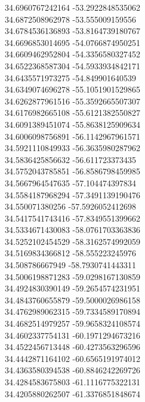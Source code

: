 {34.6960767242164	-53.2922848535062\\
34.6872508962978	-53.555009159556\\
34.6784536136893	-53.8164739180767\\
34.6696853014695	-54.0766874950251\\
34.6609462952804	-54.3356580327452\\
34.6522368587304	-54.5933934842171\\
34.6435571973275	-54.849901640539\\
34.6349074696278	-55.1051901529865\\
34.6262877961516	-55.3592665507307\\
34.6176982665108	-55.6121382550827\\
34.6091389451074	-55.8638125909634\\
34.6006098756891	-56.1142967961571\\
34.5921110849933	-56.3635980287962\\
34.5836425856632	-56.611723373435\\
34.5752043785851	-56.8586798459985\\
34.5667964547635	-57.104474397834\\
34.5584187968294	-57.3491139190476\\
34.550071380256	-57.5926052412698\\
34.5417541743416	-57.8349551399662\\
34.5334671430083	-58.0761703363836\\
34.5252102454529	-58.3162574992059\\
34.5169834366812	-58.555223245976\\
34.508786667949	-58.7930741443311\\
34.5006198871283	-59.0298167130859\\
34.4924830390149	-59.2654574231951\\
34.4843760655879	-59.5000026986158\\
34.4762989062315	-59.7334589170894\\
34.4682514979257	-59.9658324108574\\
34.4602337754131	-60.1971294673216\\
34.4522456713448	-60.4273563296596\\
34.4442871164102	-60.6565191974012\\
34.4363580394538	-60.8846242269726\\
34.4284583675803	-61.1116775322131\\
34.4205880262507	-61.3376851848674\\
}
